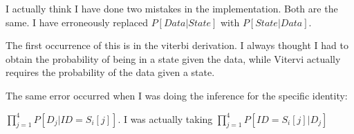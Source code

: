\documentclass[12pt]{article}
\begin{document}
I actually think I have done two mistakes in the implementation. Both are the same.
I have erroneously replaced $P\left[ {Data|State} \right]$ with  $P\left[ {State|Data} \right]$.

The first occurrence of this is in the viterbi derivation. I always thought I had to obtain the probability of being in a state given the data, while Vitervi actually requires the probability of the data given a state.

The same error occurred when I was doing the inference for the specific identity:

$\prod\limits_{j = 1}^4 {P\left[ {{D_j}|ID = {S_i}[j]} \right]} $. I was actually taking
$\prod\limits_{j = 1}^4 {P\left[ {ID = {S_i}[j]|{D_j}} \right]} $
\end{document}
